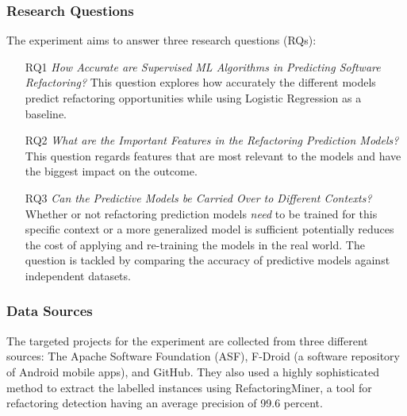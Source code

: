 \subsubsection{Research Questions}
The experiment aims to answer three research questions (RQs):
\begin{itemize}
    \item[RQ1] \textit{How Accurate are Supervised ML Algorithms in Predicting Software Refactoring?} This question explores how accurately the different models predict refactoring opportunities while using Logistic Regression as a baseline.
    \item[RQ2] \textit{What are the Important Features in the Refactoring Prediction Models?} This question regards features that are most relevant to the models and have the biggest impact on the outcome.
    \item[RQ3] \textit{Can the Predictive Models be Carried Over to Different Contexts?} Whether or not refactoring prediction models \textit{need} to be trained for this specific context or a more generalized model is sufficient potentially reduces the cost of applying and re-training the models in the real world. The question is tackled by comparing the accuracy of predictive models against independent datasets.
\end{itemize}
\subsubsection{Data Sources}
The targeted projects for the experiment are collected from three different sources: The Apache Software Foundation (ASF), F-Droid (a software repository of Android mobile apps), and GitHub. They also used a highly sophisticated method to extract the labelled instances using RefactoringMiner\cite{tsantalis2018accurate}, a tool for refactoring detection having an average precision of 99.6 percent\cite{tsantalis2022refactoringminer}.
